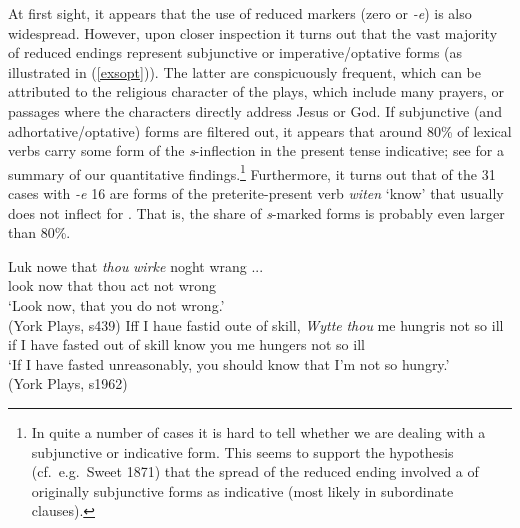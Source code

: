 \documentclass[output=paper]{langsci/langscibook}
\begin{document}
At first sight, it appears that the use of reduced markers (zero or \emph{-e})
is also widespread. However, upon closer inspection it turns out that the vast
majority of reduced endings represent subjunctive or imperative/optative forms
(as illustrated in (\ref{exsopt})). The latter are conspicuously frequent,
which can be attributed to the religious character of the plays, which include
many prayers, or passages where the characters directly address Jesus or God.
If subjunctive (and adhortative/optative) forms are filtered out, it appears
that around 80\% of \Ssg{} lexical verbs carry some form of the
\emph{s}-inflection in the present tense indicative; see
 for a summary of our quantitative
findings.\footnote{In quite a number of cases it is hard to tell whether we
    are dealing with a subjunctive or indicative form. This seems to support the
    hypothesis (cf.\ e.g.\ Sweet 1871) that the spread of the reduced ending involved
    a  of originally subjunctive forms as indicative (most likely in
subordinate clauses).} Furthermore, it turns out that of the 31 cases with
\emph{-e} 16 are forms of the preterite-present verb \emph{witen} `know' that
usually does not inflect for \Ssg{}. That is, the share of \emph{s}-marked
forms is probably even larger than 80\%.

\ea
\label{exsopt}
\ea \gll Luk nowe that \textit{thou} \textit{wirke} noght wrang ...\\
look now that thou act not wrong \\
\glt `Look now, that you do not wrong.'\\
(York Plays, s439)
\ex \gll Iff I haue fastid oute of skill, \textit{Wytte} \textit{thou} me hungris not so ill\\
if I have fasted out of skill know you me hungers not so ill\\
\glt `If I have fasted unreasonably, you should know that I'm not so hungry.'\\
(York Plays, s1962)
\z
\z

\begin{table}
\caption{Verbal endings of the second person present tense indicative in the
\emph{York Plays} (lexical verbs only)\label{table1-2ndps-lexical-verbs}}
\end{table}
\end{document}
